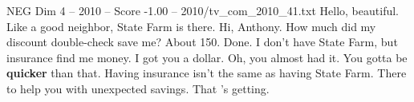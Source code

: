 \begin{textsample}{NEG Dim 4 – 2010 – Score -1.00 – 2010/tv\_com\_2010\_41.txt}  \label{ex:f4_neg_046}
Hello, beautiful.
Like a good neighbor, State Farm is there.
Hi, Anthony.
How much did my discount double-check save me?
About 150.
Done.
I don't have State Farm, but insurance find me money.
I got you a dollar.
Oh, you almost had it.
You gotta be \textbf{quicker} than that.
Having insurance isn't the same as having State Farm.
There to help you with unexpected savings.
That 's getting.

\end{textsample}
